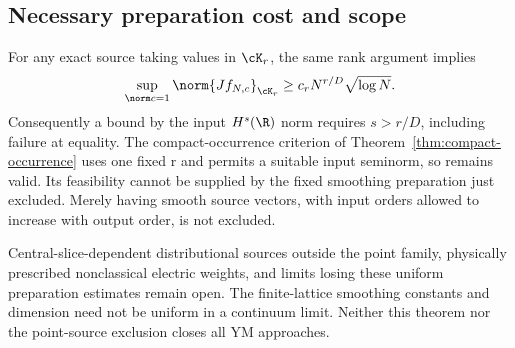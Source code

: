 \subsection{Necessary preparation cost and scope}
For any exact source taking values in $\cK_r$, the same rank argument
implies
\begin{equation}\label{eq:preparation-cost}
\sup_{\norm c=1}\norm{Jf_{N,c}}_{\cK_r}
\ge c_rN^{r/D}\sqrt{\log N}.
\end{equation}
Consequently a bound by the input $H^s(\R)$ norm requires
$s>r/D$, including failure at equality. The compact-occurrence
criterion of Theorem~\ref{thm:compact-occurrence} uses one fixed r
and permits a suitable input seminorm, so remains valid. Its
feasibility cannot be supplied by the fixed smoothing preparation
just excluded. Merely having smooth source vectors, with input
orders allowed to increase with output order, is not excluded.

Central-slice-dependent distributional sources outside the point
family, physically prescribed nonclassical electric weights, and
limits losing these uniform preparation estimates remain open.
The finite-lattice smoothing constants and dimension need not be
uniform in a continuum limit. Neither this theorem nor the
point-source exclusion closes all YM approaches.
